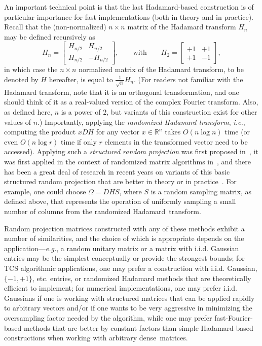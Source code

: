 \documentclass[twoside]{article}
\begin{document}
An important technical point is that the last Hadamard-based construction
is of particular importance for fast implementations (both in theory and in 
practice).  
Recall that the (non-normalized) $n \times n$ matrix of the Hadamard 
transform $H_n$ may be defined recursively as 
$$ H_n = \left[
\begin{array}{cc}
  H_{n/2} & H_{n/2} \\
  H_{n/2} & -H_{n/2}
\end{array}\right]   ,
\qquad \mbox{with} \qquad
H_2 = \left[
\begin{array}{cc}
  +1 & +1 \\
  +1 & -1
\end{array}\right] ,
$$
in which case the $n \times n$ normalized matrix of the Hadamard transform,
to be denoted by $H$ hereafter, is equal to $\frac{1}{\sqrt{n}}H_n$.
(For readers not familiar with the Hadamard transform, note that it 
is an orthogonal transformation, and one should think of it as a 
real-valued version of the complex Fourier transform.  Also, as defined 
here, $n$ is a power of $2$, but variants of this construction exist for 
other values of $n$.)
Importantly, applying the \emph{randomized Hadamard transform}, \emph{i.e.},
computing the product $xDH$ for any vector $x \in \mathbb{R}^n$ takes 
$O(n\log n)$ time (or even $O(n \log r )$ time if only $r$ elements in the 
transformed vector need to be accessed).
Applying such a \emph{structured random projection} was first proposed 
in~\cite{AC06,AC06-JRNL09}, it was first applied in the context of 
randomized matrix algorithms in~\cite{Sarlos06,DMMS07_FastL2_NM10}, and 
there has been a great deal of research in recent years on variants of this 
basic structured random projection that are better in theory or in 
practice~\cite{Matousek08_RSA,DMMS07_FastL2_NM10,LWFMRT07,RT08,AL08,LAS08,AMT10,AC10,DKT10,KN10_TR,KN10b_TR,AL11}.
For example, one could choose $\Omega = DHS$, where $S$ is a random sampling
matrix, as defined above, that represents the operation of uniformly 
sampling a small number of columns from the randomized Hadamard~transform.

Random projection matrices constructed with any of these methods exhibit a 
number of similarities, and the choice of which is appropriate depends on 
the application---\emph{e.g.}, a random unitary matrix or a matrix with 
i.i.d.  Gaussian entries may be the simplest conceptually or provide the 
strongest bounds; for TCS algorithmic applications, one may prefer a 
construction with i.i.d. Gaussian, $\{-1,+1\}$, etc. entries, or randomized 
Hadamard methods that are theoretically efficient to implement; for 
numerical implementations, one may prefer i.i.d. Gaussians if one is working 
with structured matrices that can be applied rapidly to arbitrary vectors 
and/or if one wants to be very aggressive in minimizing the oversampling 
factor needed by the algorithm, while one may prefer fast-Fourier-based 
methods that are better by constant factors than simple Hadamard-based 
constructions when working with arbitrary dense~matrices.
\end{document}
